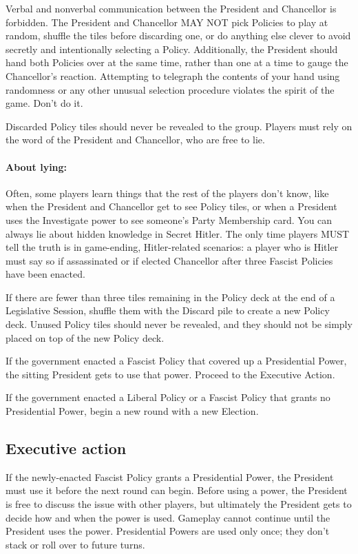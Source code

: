 \documentclass[13pt,a4paper,twocolumn,titlepage]{scrartcl}
\begin{document}
	Verbal and nonverbal communication between the President and Chancellor is forbidden. The President and Chancellor MAY NOT pick Policies to play at random, shuffle the tiles before discarding one, or do anything else clever to avoid secretly and intentionally selecting a
	Policy. Additionally, the President should hand both Policies over at the same time, rather than one at a time to gauge the Chancellor’s reaction. Attempting to telegraph the contents of your hand using randomness or any other unusual selection procedure violates the spirit of the game. Don’t do it.
	
	\textcolor{Blue3}{Discarded Policy tiles should never be revealed to the group. Players must rely on the word of the President and Chancellor, who are free to lie.}
	
	\vspace*{-8mm}
	\paragraph{\textcolor{SeaGreen4}{About lying:}}
	\textcolor{SeaGreen4}
	{
		Often, some players learn things that the rest of the players don’t know, like when the President and Chancellor get to see Policy tiles, or when a President uses the Investigate power to see someone’s Party Membership card. You can always lie about hidden knowledge in Secret Hitler. The only time players MUST tell the truth is in game-ending, Hitler-related scenarios: a player who is Hitler must say so if assassinated or if elected Chancellor after three Fascist Policies have been enacted.
	}
	
	\textcolor{Blue3}{If there are fewer than three tiles remaining in the Policy deck at the end of a Legislative Session}, shuffle them with the Discard pile to create a new Policy deck. Unused Policy tiles should never be ​revealed, and they should not​​ be simply placed on top of the new Policy deck.
	
	\textcolor{Blue3}{If the government enacted a \textcolor{fascist}{Fascist} Policy that
	covered up a Presidential Power}, the sitting
	President gets to use that power. Proceed to the
	Executive Action.
	
	\textcolor{Blue3}{If the government enacted a \textcolor{liberal}{Liberal} Policy or
	a \textcolor{fascist}{Fascist} Policy that grants no Presidential
	Power}, begin a new round with a new Election.
	
	\subsection*{Executive action}
	If the newly-enacted \textcolor{fascist}{Fascist} Policy grants a Presidential Power, the President ​
	must use it before the next round can begin. Before using a power, the President is free to discuss the issue with other players, but ultimately the	President gets to decide how and when the power is used. Gameplay cannot continue until the President uses the power. Presidential Powers are used only once; they don’t stack or roll over to future turns.
	
\end{document}
